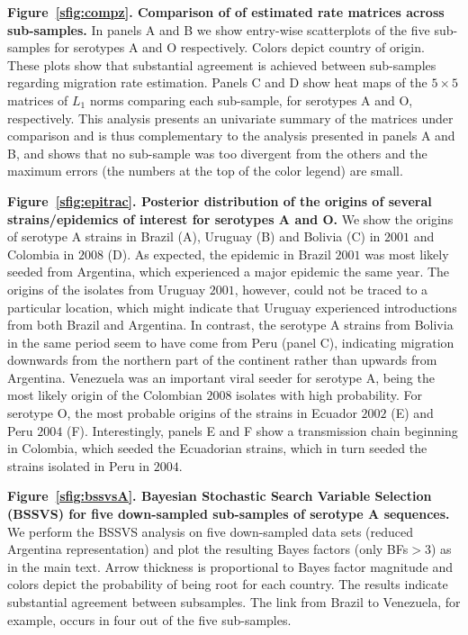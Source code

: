 \documentclass[a4paper,10pt]{article}
\begin{document}
\textbf{Figure~\ref{sfig:compz}. Comparison of of estimated rate matrices across sub-samples.}
In panels A and B we show entry-wise scatterplots of the five sub-samples for serotypes A and O respectively.
Colors depict country of origin.
These plots show that substantial agreement is achieved between sub-samples regarding migration rate estimation.
Panels C and D show heat maps of the $5\times5$ matrices of $L_1$ norms comparing each sub-sample, for serotypes A and O, respectively.
This analysis presents an univariate summary of the matrices under comparison and is thus complementary to the analysis presented in panels A and B, and shows that no sub-sample was too divergent from the others and the maximum errors (the numbers at the top of the color legend) are small. 

\textbf{Figure~\ref{sfig:epitrac}. Posterior distribution of the origins of several strains/epidemics of interest for serotypes A and O.}
We show the origins of serotype A strains in  Brazil (A), Uruguay (B) and Bolivia (C) in $2001$ and Colombia in $2008$ (D).
As expected, the epidemic in Brazil $2001$ was most likely seeded from Argentina, which experienced a major epidemic the same year.
The origins of the isolates from Uruguay $2001$, however, could not be traced to a particular location, which might indicate that Uruguay experienced introductions from both Brazil and Argentina.
In contrast, the serotype A strains from Bolivia in the same period seem to have come from Peru (panel C), indicating migration downwards from the northern part of the continent rather than upwards from Argentina.
Venezuela was an important viral seeder for serotype A, being the most likely origin of the Colombian $2008$ isolates with high probability.
For serotype O, the most probable origins of the strains in Ecuador $2002$ (E) and Peru $2004$ (F).
Interestingly, panels E and F show a transmission chain beginning in Colombia, which seeded the Ecuadorian strains, which in turn seeded the strains isolated in Peru in $2004$.
 
\textbf{Figure~\ref{sfig:bssvsA}. Bayesian Stochastic Search Variable Selection (BSSVS) for five down-sampled sub-samples of serotype A sequences.}
We perform the BSSVS analysis on five down-sampled data sets (reduced Argentina representation) and plot the resulting Bayes factors (only BFs$>3$) as in the main text.
Arrow thickness is proportional to Bayes factor magnitude and colors depict the probability of being root for each country.
The results indicate substantial agreement between subsamples.
The link from Brazil to Venezuela, for example, occurs in four out of the five sub-samples.
\end{document}
